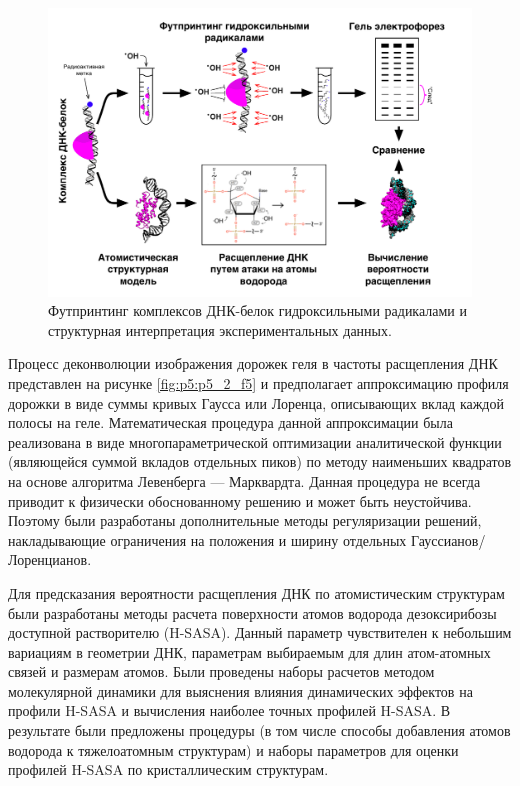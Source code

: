 \begin{figure} [H]
    \centering
    \includegraphics[width=\textwidth]{images/p5/part5_1_np/p5_1_f1.pdf}
    \caption[Футпринтинг комплексов ДНК-белок гидроксильными радикалами и структурная интерпретация экспериментальных данных.]{Футпринтинг комплексов ДНК-белок гидроксильными радикалами и структурная интерпретация экспериментальных данных. }
    \label{fig:p5_1_f1}
\end{figure}
 
Процесс деконволюции изображения дорожек геля в частоты расщепления ДНК представлен на рисунке \ref{fig:p5:p5_2_f5} и предполагает аппроксимацию профиля дорожки в виде суммы кривых Гаусса или Лоренца, описывающих вклад каждой полосы на геле. Математическая процедура данной аппроксимации была реализована в виде многопараметрической оптимизации аналитической функции (являющейся суммой вкладов отдельных пиков) по методу наименьших квадратов на основе алгоритма Левенберга — Марквардта. Данная процедура не всегда приводит к физически обоснованному решению и может быть неустойчива. Поэтому были разработаны дополнительные методы регуляризации решений, накладывающие ограничения на положения и ширину отдельных Гауссианов/Лоренцианов.



Для предсказания вероятности расщепления ДНК по атомистическим структурам были разработаны методы расчета поверхности атомов водорода дезоксирибозы доступной растворителю (H-SASA). Данный параметр чувствителен к небольшим вариациям в геометрии ДНК, параметрам выбираемым для длин атом-атомных связей и размерам атомов. Были проведены наборы расчетов методом молекулярной динамики для выяснения влияния динамических эффектов на профили H-SASA и вычисления наиболее точных профилей H-SASA. В результате были предложены процедуры (в том числе способы добавления атомов водорода к тяжелоатомным структурам) и наборы параметров для оценки профилей H-SASA по кристаллическим структурам.

